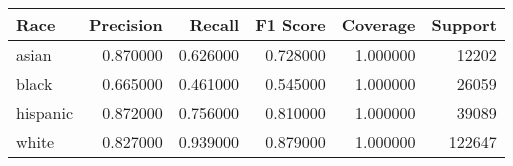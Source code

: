 \begin{tabular}{lrrrrr}
\toprule
Race & Precision & Recall & F1 Score & Coverage & Support \\
\midrule
asian & 0.870000 & 0.626000 & 0.728000 & 1.000000 & 12202 \\
black & 0.665000 & 0.461000 & 0.545000 & 1.000000 & 26059 \\
hispanic & 0.872000 & 0.756000 & 0.810000 & 1.000000 & 39089 \\
white & 0.827000 & 0.939000 & 0.879000 & 1.000000 & 122647 \\
\bottomrule
\end{tabular}
